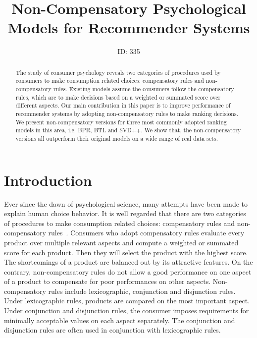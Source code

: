 \documentclass[letterpaper]{article} %
\begin{document}
%
\title{Non-Compensatory Psychological Models for Recommender Systems}
\author{ID: 335
}
\maketitle
\begin{abstract}
The study of consumer psychology reveals two categories of procedures used by consumers to make consumption related choices: compensatory rules and non-compensatory rules. Existing models assume the consumers follow the compensatory rules, which are to make decisions based on a weighted or summated score over different aspects. Our main contribution in this paper is to improve performance of recommender systems by adopting non-compensatory rules to make ranking decisions.  We present non-compensatory versions for three most commonly adopted ranking models in this area, i.e. BPR, BTL and SVD++. We show that, the non-compensatory versions all outperform their original models on a wide range of real data sets. 
\end{abstract}



\section{Introduction}

Ever since the dawn of psychological science, many attempts have been made to explain human choice behavior. It is well regarded that there are two categories of procedures to make consumption related choices: compensatory rules and non-compensatory rules~\cite{Engel1986Consumer}. Consumers who adopt compensatory rules evaluate every product over multiple relevant aspects and compute a weighted or summated score for each product. Then they will select the product with the highest score. The shortcomings of a product are balanced out by its attractive features. On the contrary, non-compensatory rules do not allow a good performance on one aspect of a product to compensate for poor performances on other aspects. Non-compensatory rules include lexicographic, conjunction and disjunction rules. Under lexicographic rules, products are compared on the most important aspect. Under conjunction and disjunction rules, the consumer imposes requirements for minimally acceptable values on each aspect separately. The conjunction and disjunction rules are often used in conjunction with lexicographic rules.
\end{document}
